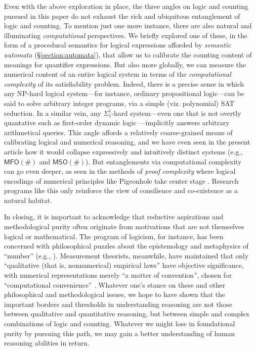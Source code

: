 \documentclass[12pt,oneside,reqno]{amsart}
\theoremstyle{definition}
\begin{document}
Even with the above exploration in place, the three angles on logic and counting pursued in this paper do not exhaust the rich and ubiquitous entanglement of logic and counting. To mention just one more instance, there are also natural and illuminating  \emph{computational} perspectives. We briefly explored one of these, in the form of a procedural semantics for logical expressions afforded by \emph{semantic automata} (\S\ref{section:automata}), that allow us to calibrate the counting content of meanings for quantifier expressions. But also more globally, we can measure the numerical content of an entire logical system in terms of the \emph{computational complexity} of its satisfiability problem. Indeed, there is a precise sense in which any NP-hard logical system---for instance, ordinary propositional logic---can be said to solve arbitrary integer programs, via a simple (viz. polynomial) SAT reduction. In a similar vein, any $\Sigma^1_1$-hard system---even one that is not overtly quantative such as first-order dynamic logic  \citep{Harel}---implicitly answers arbitrary arithmetical queries. This angle affords a relatively coarse-grained means of calibrating logical and numerical reasoning, and we have even seen in the present article how it would collapse expressively and intuitively distinct systems (e.g., $\mathsf{MFO}(\#)$ and $\mathsf{MSO}(\#)$). But entanglements via computational complexity can go even deeper, as seen in the methods of \emph{proof complexity} where logical encodings of numerical principles like Pigeonhole take center stage \citep{cook_reckhow_1979,Krajicek}. Research programs like this only reinforce the view of consilience and co-existence as a natural habitat.

In closing, it is important to acknowledge that reductive aspirations and methodological purity often originate from motivations that are not themselves logical or mathematical. The program of logicism, for instance, has been concerned with philosophical puzzles about the epistemology and metaphysics of ``number'' (e.g., \citealt{HaleWright}). Measurement theorists, meanwhile, have maintained that only ``qualitative (that is, nonnumerical) empirical laws'' have objective  significance, with numerical representations merely ``a matter of convention'', chosen for ``computational convenience'' \citep[pp. 12-13]{Krantz1971}. Whatever one's stance on these and other philosophical and methodological issues, we hope to have shown that the important borders and thresholds in understanding reasoning are not those between qualitative and quantitative reasoning, but between simple and complex combinations of logic and counting. Whatever we might lose in foundational purity by pursuing this path, we may gain a better understanding of human reasoning abilities in return. 
\end{document}
